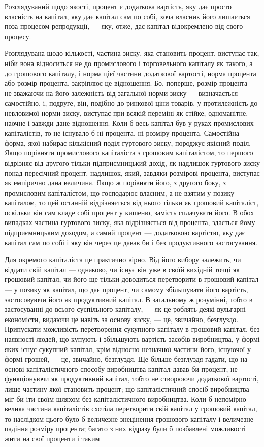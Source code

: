Розглядуваний щодо якості, процент є додаткова вартість,
яку дає просто власність на капітал, яку дає капітал сам по собі,
хоча власник його лишається поза процесом репродукції, — яку,
отже, дає капітал відокремлено від свого процесу.

Розглядувана щодо кількості, частина зиску, яка становить
процент, виступає так, ніби вона відноситься не до промислового
і торговельного капіталу як такого, а до грошового
капіталу, і норма цієї частини додаткової вартості, норма процента
або розмір процента, закріплює це відношення. Бо, поперше,
розмір процента — не зважаючи на його залежність
від загальної норми зиску — визначається самостійно, і, подруге,
він, подібно до ринкової ціни товарів, у протилежність до невловимої
норми зиску, виступає при всякій переміні як стійке,
одноманітне, наочне і завжди дане відношення. Коли б весь
капітал був у руках промислових капіталістів, то не існувало
б ні процента, ні розміру процента. Самостійна форма,
якої набирає кількісний поділ гуртового зиску, породжує якісний
поділ. Якщо порівняти промислового капіталіста з грошовим
капіталістом, то першого відрізняє від другого тільки підприємницький
дохід, як надлишок гуртового зиску понад
пересічний процент, надлишок, який, завдяки розмірові процента,
виступає як емпірично дана величина. Якщо ж порівняти
його, з другого боку, з промисловим капіталістом, що
господарює власним, а не взятим у позику капіталом, то цей
останній відрізняється від нього тільки як грошовий капіталіст,
оскільки він сам кладе собі процент у кишеню, замість
сплачувати його. В обох випадках частина гуртового зиску, яка
відрізняється від процента, здається йому підприємницьким доходом,
а самий процент — додатковою вартістю, яку дає капітал
сам по собі і яку він через це давав би і без продуктивного
застосування.

Для окремого капіталіста це практично вірно. Від його вибору
залежить, чи віддати свій капітал — однаково, чи існує
він уже в своїй вихідній точці як грошовий капітал, чи його
ще тільки доводиться перетворити в грошовий капітал — у позику
як капітал, що дає процент, чи самому збільшувати його
вартість, застосовуючи його як продуктивний капітал. В загальному
ж розумінні, тобто в застосуванні до всього суспільного
капіталу, — як це роблять деякі вульгарні економісти, видаючи
це навіть за основу зиску, — це, звичайно, безглуздо. Припускати
можливість перетворення сукупного капіталу в грошовий капітал,
без наявності людей, що купують і збільшують вартість
засобів виробництва, у формі яких існує сукупний капітал, крім
відносно незначної частини його, існуючої у формі грошей, — це,
звичайно, безглуздя. Ще більше безглуздя гадати, що на основі
капіталістичного способу виробництва капітал давав би процент,
не функціонуючи як продуктивний капітал, тобто не створюючи
додаткової вартості, лише частину якої становить процент; що
капіталістичний спосіб виробництва міг би іти своїм шляхом без
капіталістичного виробництва. Коли б непомірно велика частина
капіталістів схотіла перетворити свій капітал у грошовий капітал,
то наслідком цього було б величезне знецінення грошового капіталу
і величезне падіння розміру процента; багато з них відразу
були б позбавлені можливості жити на свої проценти і таким
\parbreak{}  %
